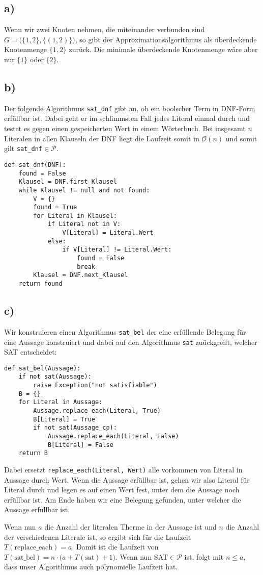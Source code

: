 \documentclass[a4paper,11pt]{article}
\begin{document}
\subsection*{a)}
Wenn wir zwei Knoten nehmen, die miteinander verbunden sind $G=\big(\{1,2\},\{(1,2)\}\big)$, so gibt der Approximationsalgorithmus als überdeckende Knotenmenge $\{1,2\}$ zurück. Die minimale überdeckende Knotenmenge wäre aber nur $\{1\}$ oder $\{2\}$.

\subsection*{b)}
Der folgende Algorithmus \lstinline|sat_dnf| gibt an, ob ein boolscher Term in DNF-Form erfüllbar ist. Dabei geht er im schlimmsten Fall jedes Literal einmal durch und testet es gegen einen gespeicherten Wert in einem Wörterbuch. Bei insgesamt $n$ Literalen in allen Klauseln der DNF liegt die Laufzeit somit in $\mathcal{O}(n)$ und somit gilt \lstinline|sat_dnf|$\in\mathcal{P}$.

\begin{lstlisting}
def sat_dnf(DNF):
	found = False
	Klausel = DNF.first_Klausel
	while Klausel != null and not found:
		V = {}
		found = True
		for Literal in Klausel:
			if Literal not in V:
				V[Literal] = Literal.Wert
			else:
				if V[Literal] != Literal.Wert:
					found = False
					break
		Klausel = DNF.next_Klausel
	return found
\end{lstlisting}

\subsection*{c)}

Wir konstruieren einen Algorithmus \lstinline|sat_bel| der eine erfüllende Belegung für eine Aussage konstruiert und dabei auf den Algorithmus \lstinline|sat| zuückgreift, welcher SAT entscheidet: 

\begin{lstlisting}
def sat_bel(Aussage):
	if not sat(Aussage):
		raise Exception("not satisfiable")
	B = {}
	for Literal in Aussage:
		Aussage.replace_each(Literal, True)
		B[Literal] = True
		if not sat(Aussage_cp):
			Aussage.replace_each(Literal, False)
			B[Literal] = False
	return B
\end{lstlisting}

Dabei ersetzt \lstinline|replace_each(Literal, Wert)| alle vorkommen von Literal in Aussage durch Wert. Wenn die Aussage erfüllbar ist, gehen wir also Literal für Literal durch und legen es auf einen Wert fest, unter dem die Aussage noch erfüllbar ist. Am Ende haben wir eine Belegung gefunden, unter welcher die Aussage erfüllbar ist. 

Wenn nun $a$ die Anzahl der literalen Therme in der Aussage ist und $n$ die Anzahl der verschiedenen Literale ist, so ergibt sich für die Laufzeit $T(\text{replace\_each}) = a$. Damit ist die Laufzeit von $T(\text{sat\_bel}) = n\cdot\big(a+T(\text{sat})+1\big)$. Wenn nun SAT$\in\mathcal{P}$ ist, folgt mit $n\leq a$, dass unser Algorithmus auch polynomielle Laufzeit hat.
\end{document}
